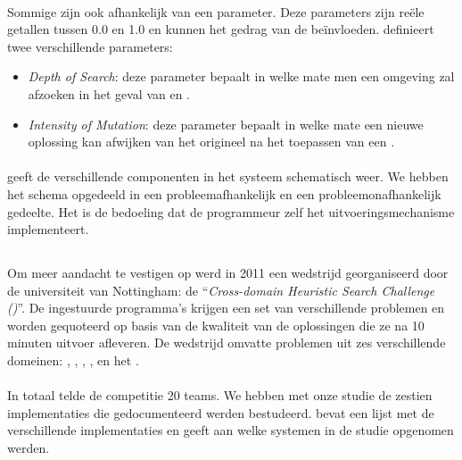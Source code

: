 \paragraph{}
Sommige \abllhn{} zijn ook afhankelijk van een parameter. Deze parameters zijn re\"ele getallen tussen 0.0 en 1.0 en kunnen het gedrag van de \abllh{} be\"invloeden. \abhf{} definieert twee verschillende parameters:
\begin{itemize}
 \item \emph{Depth of Search}: deze parameter bepaalt in welke mate men een omgeving zal afzoeken in het geval van \abrr{} en \abls{}.
 \item \emph{Intensity of Mutation}: deze parameter bepaalt in welke mate een nieuwe oplossing kan afwijken van het origineel na het toepassen van een \abmt{}.
\end{itemize}


\paragraph{}
 geeft de verschillende componenten in het \abhf{} systeem schematisch weer. We hebben het schema opgedeeld in een probleemafhankelijk en een probleemonafhankelijk gedeelte. Het is de bedoeling dat de programmeur zelf het uitvoeringsmechanisme implementeert.


\subsection{\abchescy{}}

Om meer aandacht te vestigen op \abhf{} werd in 2011 een wedstrijd georganiseerd door de universiteit van Nottingham: de ``\emph{Cross-domain Heuristic Search Challenge (\abchescy)}''\cite{Burke:2011:CHS:2177360.2177415}. De ingestuurde programma's krijgen een set van verschillende problemen en worden gequoteerd op basis van de kwaliteit van de oplossingen die ze na 10 minuten uitvoer afleveren. De wedstrijd omvatte problemen uit zes verschillende domeinen: , , , ,  en het .

\paragraph{}
In totaal telde de competitie 20 teams. We hebben met onze studie de zestien implementaties die gedocumenteerd werden bestudeerd.  bevat een lijst met de verschillende implementaties en geeft aan welke systemen in de studie opgenomen werden.


